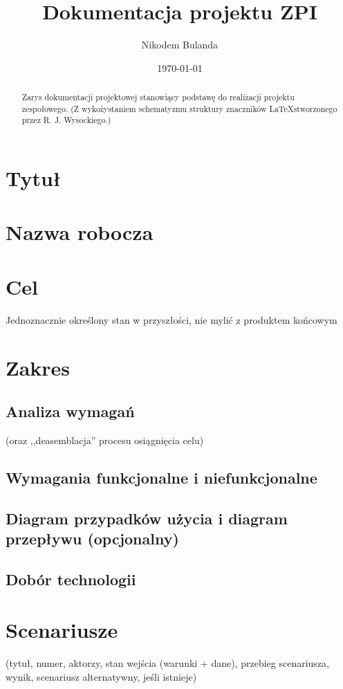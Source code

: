 \documentclass[12pt,a4paper]{article}
\begin{document}
\title{Dokumentacja projektu ZPI}
\author{Nikodem Bulanda}
\date{\today}

\maketitle

\begin{abstract}
Zarys dokumentacji projektowej stanowiący podstawę do realizacji projektu zespołowego. (Z wykożystaniem schematyzmu struktury znaczników \LaTeX  stworzonego przez R. J. Wysockiego.) 
\end{abstract}

\newpage

\tableofcontents
\listoftables
\listoffigures

\newpage

\section{Tytuł}
\section{Nazwa robocza}
\section{Cel}
Jednoznacznie określony stan w przyszłości, nie mylić z produktem końcowym
\section{Zakres}
\subsection{Analiza wymagań}
 (oraz ,,deasemblacja'' procesu osiągnięcia celu)
\subsection{Wymagania funkcjonalne i niefunkcjonalne}
\subsection{Diagram przypadków użycia i diagram przepływu (opcjonalny)}
\subsection{Dobór technologii}
\section{Scenariusze}
(tytuł, numer, aktorzy, stan wejścia (warunki + dane), przebieg scenariusza, wynik, scenariusz alternatywny, jeśli istnieje)
\end{document}
